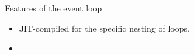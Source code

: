 \documentclass{beamer}
\begin{document}








\begin{frame}{Features of the event loop}
\begin{itemize}
\item JIT-compiled for the specific nesting of loops.
\item



\end{itemize}
\end{frame}
\end{document}

